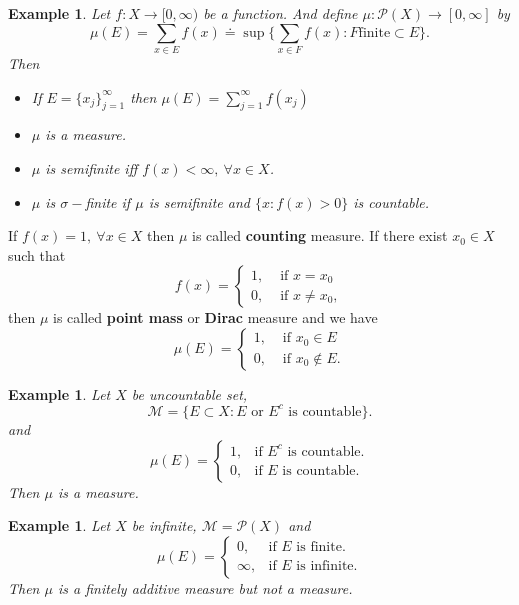 \documentclass[12pt]{report}
\newtheorem{example}[theorem]{Example}
\newtheorem{examp}{Example}[section]
\begin{document}
\begin{examp}  Let $f: X \longrightarrow [0, \infty)$ be a function. And
define
$\mu: \mathcal{P}(X) \longrightarrow [0, \infty]$ by
\[
\mu(E) = \sum_{x \in E} f(x) \doteq  \sup \{\sum_{x \in F} f(x): F \mbox{
finite}
\subset E\}.
\] Then

\begin{itemize}
\item[0.]  If $E = \{x_j \}^\infty_{j=1}$ then $\mu(E) = \sum^\infty_{j=1} f
(x_j)$
 \item[1.]  $\mu$ is a measure.
\item[2.] $\mu$ is semifinite iff $f(x) < \infty, \ \forall x \in X$.
\item[3.]  $\mu$ is $\sigma-$finite  if  $\mu$  is semifinite and $\{x: f(x) >
0\}$ is countable.
\end{itemize}
\end{examp} If $f(x) = 1, \ \forall x \in X$ then $\mu$ is called {\bf
counting} measure.  If there exist $x_0 \in X$ such that
\[  f(x) = \left \{ \begin{array}{ll} 1, &\mbox{ if } x = x_0\\ 0, &\mbox{ if } x
\ne x_0,
\end{array} \right .
\] then $\mu $ is called {\bf point mass} or {\bf Dirac} measure and we
have
\[
\mu(E) = \left \{ \begin{array}{ll} 1, &\mbox{ if } x_0 \in E\\ 0, &\mbox{ if }
x_0 \notin E.
\end{array} \right .
\]
\begin{example}  Let $X$ be uncountable set,
\[
\mathcal{M} = \{E \subset X: E \mbox{ or } E^c \mbox{ is countable}\}.
\] and
\[
\mu(E) = \left \{ \begin{array}{ll} 1, &\mbox{if }  E^c \mbox{ is countable.}\\
0, &\mbox{if } E \mbox{ is countable.}
\end{array} \right .
\] Then $\mu$ is a measure.
\end{example}

\begin{example}  Let $X$ be infinite, $\mathcal{M} =
\mathcal{P} (X)$ and
 \[
\mu(E) = \left \{ \begin{array}{ll} 0, &\mbox{if } E \mbox{ is finite.}\\
\infty, &\mbox{if } E \mbox{ is infinite.}
\end{array}
\right .
\] Then $\mu$ is a finitely additive measure but not a measure.
\end{example}
\end{document}
